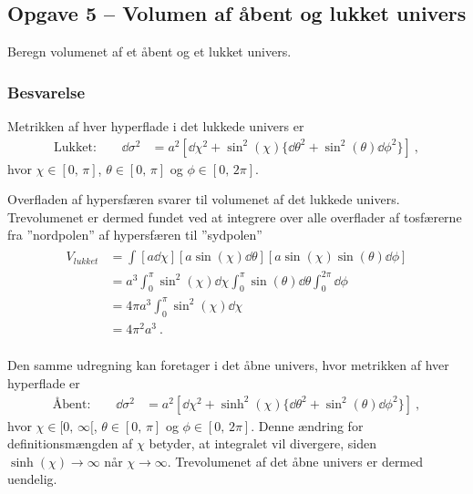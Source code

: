 \documentclass[../main.tex]{subfiles}
\begin{document}

\subsection{Opgave 5 -- Volumen af åbent og lukket univers}
\setcounter{subsection}{5}
\setcounter{equation}{0}

Beregn volumenet af et åbent og et lukket univers.


\subsubsection*{Besvarelse}

Metrikken af hver hyperflade i det lukkede univers er
\begin{align}
    \text{Lukket:} \qquad
    \dd \sigma^2 &= a^2 \left[ \dd\chi^2 + \sin^2(\chi) \{ \dd \theta^2 + \sin^2(\theta) \dd \phi^2 \} \right] \: ,
\end{align}
hvor $\chi \in [0,\, \pi]$, $\theta \in [0,\, \pi]$ og $\phi \in [0,\, 2\pi]$.

Overfladen af hypersfæren svarer til volumenet af det lukkede univers. Trevolumenet er dermed fundet ved at integrere over alle overflader af tosfærerne fra ''nordpolen'' af hypersfæren til ''sydpolen''
\begin{align}
\begin{split}
    V_{lukket} &= \int [a \dd \chi] [a \sin(\chi) \dd \theta] [a \sin(\chi) \sin(\theta) \dd \phi] \\
        &= a^3 \int_0^\pi \sin^2(\chi) \dd \chi \int_0^\pi \sin(\theta) \dd\theta \int_0^{2\pi} \dd\phi \\
        &= 4 \pi a^3 \int_0^\pi \sin^2(\chi) \dd \chi \\
        &= 4 \pi^2 a^3 \: .
\end{split}
\end{align}
\\

Den samme udregning kan foretager i det åbne univers, hvor metrikken af hver hyperflade er
\begin{align}
    \text{Åbent:} \qquad
    \dd \sigma^2 &= a^2 \left[ \dd\chi^2 + \sinh^2(\chi) \{ \dd \theta^2 + \sin^2(\theta) \dd \phi^2 \} \right] \: ,
\end{align}
hvor $\chi \in [0,\, \infty[$, $\theta \in [0,\, \pi]$ og $\phi \in [0,\, 2\pi]$. Denne ændring for definitionsmængden af $\chi$ betyder, at integralet vil divergere, siden $\sinh(\chi) \rightarrow \infty$ når $\chi \rightarrow \infty$. Trevolumenet af det åbne univers er dermed uendelig.



\end{document}
